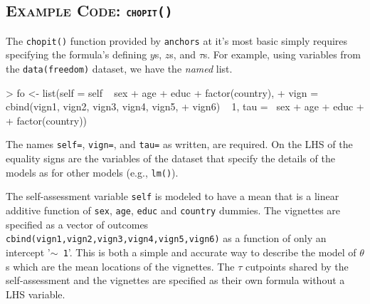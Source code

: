 \documentclass{amsart}
\newcommand{\code}[1]{{\texttt{#1}}}
\newcommand{\pkg}[1]{{\texttt{#1}}}
\newcommand{\ssubsection}[2]{%
  \subsection[#1]{\normalfont\scshape #1: {\tt #2}}}
\begin{document}
\ssubsection{Example Code}{chopit()}

The \code{chopit()} function provided by \pkg{anchors} at it's most
basic simply requires specifying the formula's defining $y$s, $z$s,
and $\tau$s.  For example, using variables from the
\code{data(freedom)} dataset, we have the {\em named} list.
\begin{Schunk}
\begin{Sinput}
> fo <- list(self = self ~ sex + age + educ + factor(country), 
+     vign = cbind(vign1, vign2, vign3, vign4, vign5, 
+         vign6) ~ 1, tau = ~sex + age + educ + 
+         factor(country))
\end{Sinput}
\end{Schunk}
The names \code{self=}, \code{vign=}, and \code{tau=} as written, are
required.  On the LHS of the equality signs are the variables of the
dataset that specify the details of the models as for other models
(e.g., \code{lm()}).

The self-assessment variable \code{self} is modeled to have a mean
that is a linear additive function of \code{sex}, \code{age},
\code{educ} and \code{country} dummies.  The vignettes are specified
as a vector of outcomes
\code{cbind(vign1,vign2,vign3,vign4,vign5,vign6)} as a function of
only an intercept '\code{$\sim$ 1}'.  This is both a simple and
accurate way to describe the model of $\theta$s which are the mean
locations of the vignettes.  The $\tau$ cutpoints shared by the
self-assessment and the vignettes are specified as their own formula
without a LHS variable.
\end{document}
